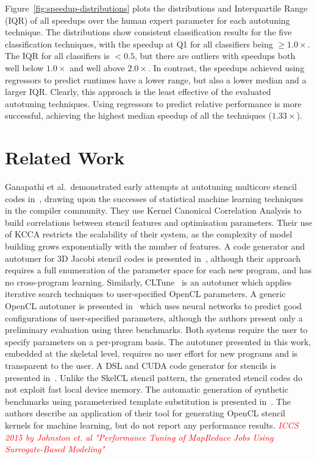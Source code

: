 \documentclass[preprint,nonatbib,10pt,nocopyrightspace]{sigplanconf}
\newcommand{\fix}[1]{\textcolor{red}{\em\footnotesize#1}}
\begin{document}
Figure~\ref{fig:speedup-distributions} plots the distributions and
Interquartile Range (IQR) of all speedups over the human expert
parameter for each autotuning technique. The distributions show
consistent classification results for the five classification
techniques, with the speedup at Q1 for all classifiers being
$\ge 1.0\times$. The IQR for all classifiers is $< 0.5$, but there are
outliers with speedups both well below $1.0\times$ and well above
$2.0\times$. In contrast, the speedups achieved using regressors to
predict runtimes have a lower range, but also a lower median and a
larger IQR. Clearly, this approach is the least effective of the
evaluated autotuning techniques. Using regressors to predict relative
performance is more successful, achieving the highest median speedup
of all the techniques ($1.33\times$).


\section{Related Work}\label{sec:related}

Ganapathi et al.\ demonstrated early attempts at autotuning multicore
stencil codes in~\cite{Ganapathi2009}, drawing upon the successes of
statistical machine learning techniques in the compiler
community. They use Kernel Canonical Correlation Analysis to build
correlations between stencil features and optimisation
parameters. Their use of KCCA restricts the scalability of their
system, as the complexity of model building grows exponentially with
the number of features. A code generator and autotuner for 3D Jacobi
stencil codes is presented in~\cite{Zhang2013a}, although their
approach requires a full enumeration of the parameter space for each
new program, and has no cross-program learning. Similarly,
CLTune~\cite{Nugteren2015} is an autotuner which applies iterative
search techniques to user-specified OpenCL parameters. A generic
OpenCL autotuner is presented in~\cite{Falch2015} which uses neural
networks to predict good configurations of user-specified parameters,
although the authors present only a preliminary evaluation using three
benchmarks. Both systems require the user to specify parameters on a
per-program basis. The autotuner presented in this work, embedded at
the skeletal level, requires no user effort for new programs and is
transparent to the user. A DSL and CUDA code generator for stencils is
presented in~\cite{Kamil2010}. Unlike the SkelCL stencil pattern, the
generated stencil codes do not exploit fast local device memory. The
automatic generation of synthetic benchmarks using parameterised
template substitution is presented in~\cite{Chiu2015}. The authors
describe an application of their tool for generating OpenCL stencil
kernels for machine learning, but do not report any performance
results. \fix{ICCS 2015 by Johnston et. al "Performance Tuning of
  MapReduce Jobs Using Surrogate-Based Modeling"}
\end{document}
